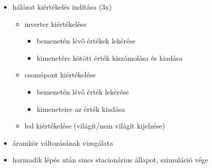 {\begin{itemize}
\begin{itemize}
\setlength{\itemsep}{0cm}%
\setlength{\parskip}{0cm}%
\item hálózat kiértékelés indítása (3x)
\begin{itemize}
\setlength{\itemsep}{0cm}%
\setlength{\parskip}{0cm}%
\item inverter kiértékelése
\begin{itemize}
\setlength{\itemsep}{0cm}%
\setlength{\parskip}{0cm}%
\item bemenetén lévő értékek lekérése
\item kimenetére kötött érték kiszámolása és kiadása
\end{itemize}
\item csomópont kiértékelése
\begin{itemize}
\setlength{\itemsep}{0cm}%
\setlength{\parskip}{0cm}%
\item bemenetén lévő érték lekérése
\item kimeneteire az érték kiadása
\end{itemize}
\item led kiértékelése (világít/nem világít kijelzése)
\end{itemize}
\item áramkör változásának vizsgálata
\item harmadik lépés után sincs stacionárius állapot, szimuláció vége
\end{itemize}
\end{itemize}
\vspace{-15pt}}

